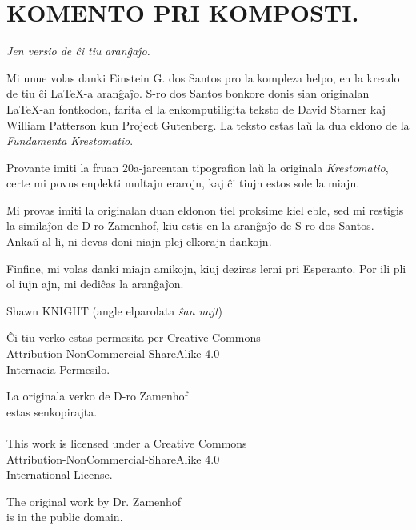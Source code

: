 \chapter*{KOMENTO PRI KOMPOSTI.}

\begin{center}
\emph{Jen versio \laversio{} de ĉi tiu} \XeLaTeX{} \emph{aranĝaĵo.}
\end{center}

Mi unue volas danki Einstein G. dos Santos pro la kompleza helpo, en la kreado de tiu ĉi \LaTeX{}-a aranĝaĵo.  S-ro dos Santos bonkore donis sian originalan \LaTeX{}-an fontkodon, farita el la enkomputiligita teksto de David Starner kaj William Patterson kun Project Gutenberg.  La teksto estas laŭ la dua eldono de la \emph{Fundamenta Krestomatio}.

Provante imiti la fruan 20a-jarcentan tipografion laŭ la originala \emph{Krestomatio}, certe mi povus enplekti multajn erarojn, kaj ĉi tiujn estos sole la miajn.

Mi provas imiti la originalan duan eldonon tiel proksime kiel eble, sed mi restigis la similaĵon de D-ro Zamenhof, kiu estis en la aranĝaĵo de S-ro dos Santos.  Ankaŭ al li, ni devas doni niajn plej elkorajn dankojn.

Finfine, mi volas danki miajn amikojn, kiuj deziras lerni pri Esperanto.  Por ili pli ol iujn ajn, mi dediĉas la aranĝaĵon.

\vspace{1em}

{\setlength{\parindent}{0em}
Shawn KNIGHT (angle elparolata \emph{ŝan najt})\\
\hodiau}

\newpage
\thispagestyle{empty}
\vspace*{\fill}
\begin{center}
Ĉi tiu verko estas permesita per Creative Commons \\
Attribution-NonCommercial-ShareAlike 4.0 \\
Internacia Permesilo.

La originala verko de D-ro Zamenhof \\
estas senkopirajta.\\[1ex]

\ccbyncsa\\[1ex]

This work is licensed under a Creative Commons \\
Attribution-NonCommercial-ShareAlike 4.0 \\
International License.

The original work by Dr. Zamenhof \\
is in the public domain.
\vspace*{\fill}
\end{center}